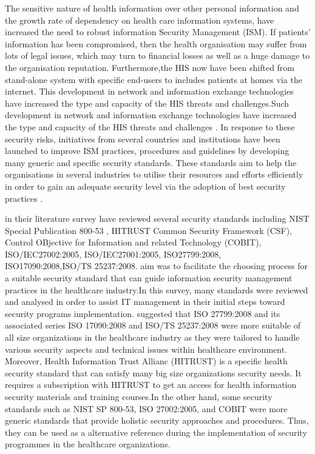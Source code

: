 The sensitive nature of health information over other personal information and the growth rate of dependency on health care information systems, have increased the need to robust information Security Management (ISM). If patients' information has been compromised, then the health organisation may suffer from lots of legal issues, which may turn to financial losses as well as a huge damage to the organisation reputation. Furthermore,the HIS now have been shifted from stand-alone system with specific end-users to includes patients at homes via the internet. This development in network and information exchange technologies have increased the type and capacity of the HIS threats and challenges.Such development in network and information exchange technologies have increased the type and capacity of the HIS threats and challenges \cite{Hsu}. 
In response to these security risks, initiatives from several countries and institutions have been launched to improve ISM practices, procedures and guidelines by developing many generic and specific security standards. These standards aim to help the organisations in several industries to utilise their resources and efforts efficiently in order to gain an adequate security level via the adoption of best security practices \cite{Rahim2016,Akowuah2013}.


\citet{Akowuah2013} in their literature survey have reviewed several security standards including NIST Special Publication 800-53 , HITRUST Common Security Framework (CSF), Control OBjective for Information and related Technology (COBIT), ISO/IEC27002:2005, ISO/IEC27001:2005, ISO27799:2008, ISO17090:2008,ISO/TS 25237:2008. \cite{Akowuah2013} aim was to facilitate the choosing process for a suitable security standard that can guide information security management practices in the healthcare industry.In this survey, many standards were reviewed and analysed in order to assist IT management in their initial steps toward security programs implementation. \citet{Akowuah2013} suggested that ISO 27799:2008 and its associated series ISO 17090:2008 and ISO/TS 25237:2008 were more suitable of all size organizations in the healthcare industry as they were tailored to handle various security aspects and technical issues within healthcare environment. Moreover, Health Information Trust Allianc (HITRUST) is a specific health security standard that can satisfy many big size organizations security needs. It requires a subscription with HITRUST to get an access for health information security materials and training courses.In the other hand, some security standards such as NIST SP 800-53, ISO 27002:2005, and COBIT were more generic standards that provide holistic security approaches and procedures. Thus, they can be used as a alternative reference during the implementation of  security programmes in the healthcare organizations\cite{Akowuah2013}. 

